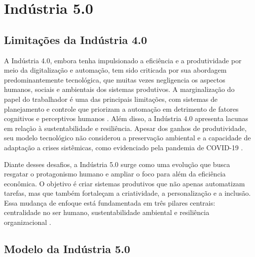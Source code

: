 
\chapter{Indústria 5.0}\label{cap:indutria5_0}

\section{Limitações da Indústria 4.0}

A Indústria 4.0, embora tenha impulsionado a eficiência e a produtividade por meio da digitalização e automação, tem sido criticada por sua abordagem predominantemente tecnológica, que muitas vezes negligencia os aspectos humanos, sociais e ambientais dos sistemas produtivos.
A marginalização do papel do trabalhador é uma das principais limitações, com sistemas de planejamento e controle que priorizam a automação em detrimento de fatores cognitivos e perceptivos humanos \cite{RANNERTSHAUSER2022}.
Além disso, a Indústria 4.0 apresenta lacunas em relação à sustentabilidade e resiliência. Apesar dos ganhos de produtividade, seu modelo tecnológico não considerou a preservação ambiental e a capacidade de adaptação a crises sistêmicas, como evidenciado pela pandemia de COVID-19 \cite{euCommission2021, Khan2023}.

Diante desses desafios, a Indústria 5.0 surge como uma evolução que busca resgatar o protagonismo humano e ampliar o foco para além da eficiência econômica.
O objetivo é criar sistemas produtivos que não apenas automatizam tarefas, mas que também fortaleçam a criatividade, a personalização e a inclusão.
Essa mudança de enfoque está fundamentada em três pilares centrais: centralidade no ser humano, sustentabilidade ambiental e resiliência organizacional \cite{euCommission2021, Nahavandi2019}.

\section{Modelo da Indústria 5.0}

